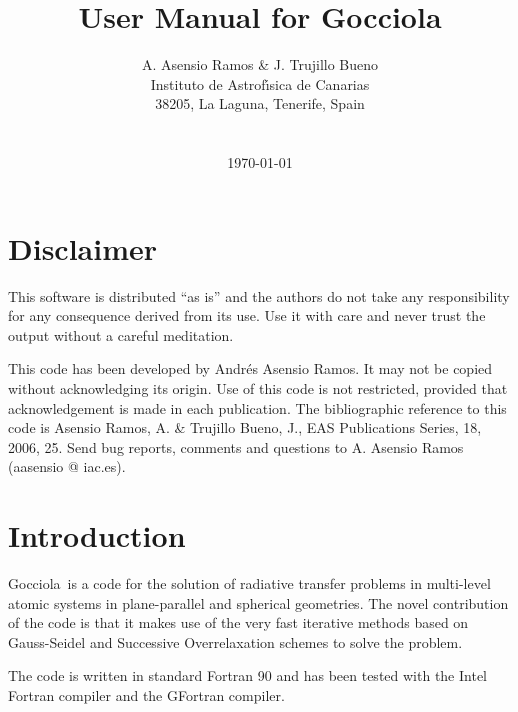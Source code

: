 \documentclass[12pt]{article}
\def\G{Gocciola}
\begin{document}
\title                  {\sc User Manual for \G}

\author{ A. Asensio Ramos \& J. Trujillo Bueno\\
         Instituto de Astrof\'{\i}sica de Canarias\\
         38205, La Laguna, Tenerife, Spain\\ \\
        \\[0.5in] \today}%
\date{}
\maketitle


\tableofcontents

\newpage

\section*{Disclaimer}

This software is distributed ``as is'' and the authors do not take any
responsibility for any consequence derived from its use. Use it with care and
never trust the output without a careful meditation. 

This code has been developed by Andr\'es Asensio Ramos. It may not be copied
without acknowledging its origin. Use of this code is not restricted, provided
that acknowledgement is made in each publication. The bibliographic reference
to this code is Asensio Ramos, A. \& Trujillo Bueno, J., EAS Publications 
Series, 18, 2006, 25. Send bug
reports, comments and questions to A. Asensio Ramos (aasensio @ iac.es).


\newpage

\section{Introduction}

\G\ is a code for the solution of radiative transfer problems in
multi-level atomic systems in plane-parallel and spherical
geometries. The novel contribution of the code is that it
makes use of the very fast iterative methods based on Gauss-Seidel
and Successive Overrelaxation schemes to solve the problem.

The code is written in standard Fortran 90 and has been tested
with the Intel Fortran compiler and the GFortran compiler.
\end{document}

